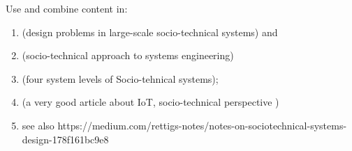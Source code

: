\begin{svgraybox}
Use and combine content in:
\begin{enumerate}
\item \cite{Norman2015} (design problems in large-scale socio-technical systems) and 
\item \cite{Baxter2011} (socio-technical approach to systems engineering)
\item \cite{Whitworth2009} (four system levels of Socio-tehnical systems); 
\item \cite{Shin2014} (a very good article about IoT, socio-technical perspective )
\item see also https://medium.com/rettigs-notes/notes-on-sociotechnical-systems-design-178f161bc9e8 
\end{enumerate}
\end{svgraybox}

